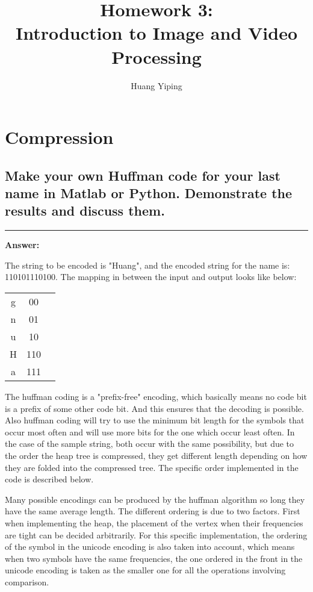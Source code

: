 \documentclass[conference]{styles/acmsiggraph}
\title{\huge Homework 3: \\ \LARGE {Introduction to Image and Video Processing}}
\author{\Large Huang Yiping \\}
\newenvironment{answer}{}{}
\begin{document}
\maketitle


\section{Compression}

\subsection{Make your own Huffman code for your last name in Matlab or Python. Demonstrate the results
and discuss them.}

\begin{answer}
	\rule{\textwidth}{0.4pt}
	
	\textbf{Answer:}

	The string to be encoded is "Huang", and the encoded string for the name is: 110101110100. The mapping in between the input and output looks like below:
	\begin{center}
		\begin{tabular}{ c c c }
		 g & 00\\
		 n & 01\\
		 u & 10\\
		 H & 110\\
		 a & 111\\
		\end{tabular}
		\end{center}
	
	The huffman coding is a "prefix-free" encoding, which basically means no code bit is a prefix of some other code bit. And this ensures that the decoding is possible. Also huffman coding will try to use the minimum bit length for the symbols that occur most often and will use more bits for the one which occur least often. In the case of the sample string, both occur with the same possibility, but due to the order the heap tree is compressed, they get different length depending on how they are folded into the compressed tree. The specific order implemented in the code is described below.

	Many possible encodings can be produced by the huffman algorithm so long they have the same average length. The different ordering is due to two factors. First when implementing the heap, the placement of the vertex when their frequencies are tight can be decided arbitrarily. For this specific implementation, the ordering of the symbol in the unicode encoding is also taken into account, which means when two symbols have the same frequencies, the one ordered in the front in the unicode encoding is taken as the smaller one for all the operations involving comparison.


\end{answer}
\end{document}
